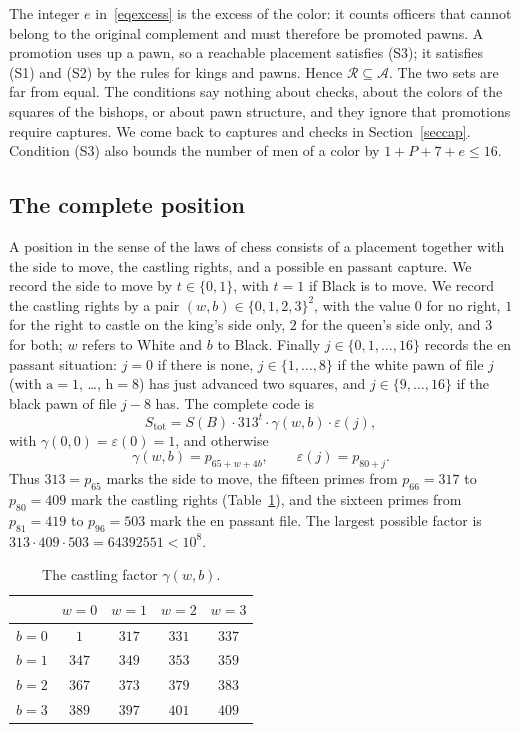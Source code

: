 \documentclass[12pt,reqno]{article}
\newcommand{\adm}{\mathcal{A}}
\newcommand{\rea}{\mathcal{R}}
\newcommand{\sq}[1]{\mathrm{#1}}
\begin{document}
The integer $e$ in~\eqref{eqexcess} is the excess of the color: it counts officers that
cannot belong to the original complement and must therefore be promoted pawns. A promotion
uses up a pawn, so a reachable placement satisfies (S3); it satisfies (S1) and (S2) by the
rules for kings and pawns. Hence $\rea\subseteq\adm$. The two sets are far from equal. The
conditions say nothing about checks, about the colors of the squares of the bishops, or about
pawn structure, and they ignore that promotions require captures. We come back to captures and
checks in Section~\ref{seccap}.
Condition (S3) also bounds the number of men of a color by $1+P+7+e\leq 16$.

\subsection{The complete position}

A position in the sense of the laws of chess consists of a placement together with the side to
move, the castling rights, and a possible en passant capture. We record the side to move by
$t\in\{0,1\}$, with $t=1$ if Black is to move. We record the castling rights by a pair
$(w,b)\in\{0,1,2,3\}^2$, with the value $0$ for no right, $1$ for the right to castle on the
king's side only, $2$ for the queen's side only, and $3$ for both; $w$ refers to White and
$b$ to Black. Finally $j\in\{0,1,\ldots,16\}$ records the en passant situation: $j=0$ if there
is none, $j\in\{1,\ldots,8\}$ if the white pawn of file $j$ (with $\sq{a}=1$, \ldots, $\sq{h}=8$) has
just advanced two squares, and $j\in\{9,\ldots,16\}$ if the black pawn of file $j-8$ has. The
complete code is
\begin{equation}\label{eqtotal}
S_{\mathrm{tot}}=S(B)\cdot 313^{t}\cdot \gamma(w,b)\cdot\varepsilon(j),
\end{equation}
with $\gamma(0,0)=\varepsilon(0)=1$, and otherwise
\begin{displaymath}
\gamma(w,b)=p_{65+w+4b},\qquad \varepsilon(j)=p_{80+j} .
\end{displaymath}
Thus $313=p_{65}$ marks the side to move, the fifteen primes from $p_{66}=317$ to $p_{80}=409$
mark the castling rights (Table~\ref{tabcastle}), and the sixteen primes from $p_{81}=419$ to
$p_{96}=503$ mark the en passant file. The largest possible factor is
$313\cdot 409\cdot 503=64392551<10^{8}$.

\begin{table}[H]
\begin{center}
\begin{tabular}{l|cccc}
 & $w=0$ & $w=1$ & $w=2$ & $w=3$\\ \hline
$b=0$ & $1$ & $317$ & $331$ & $337$\\
$b=1$ & $347$ & $349$ & $353$ & $359$\\
$b=2$ & $367$ & $373$ & $379$ & $383$\\
$b=3$ & $389$ & $397$ & $401$ & $409$
\end{tabular}
\end{center}
\caption{The castling factor $\gamma(w,b)$.}
\label{tabcastle}
\end{table}
\end{document}

